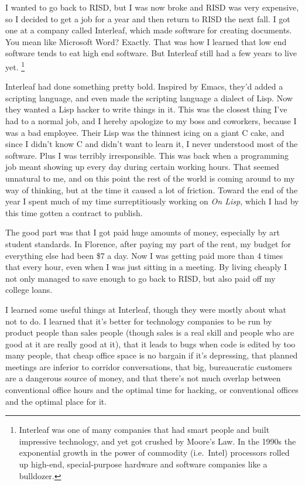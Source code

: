 \documentclass[12pt]{book}
\begin{document}
I wanted to go back to RISD, but I was now broke and RISD was very
expensive, so I decided to get a job for a year and then return to RISD
the next fall. I got one at a company called Interleaf, which made
software for creating documents. You mean like Microsoft Word? Exactly.
That was how I learned that low end software tends to eat high end
software. But Interleaf still had a few years to live yet.
\footnote{Interleaf was one of many companies that had smart people and
built impressive technology, and yet got crushed by Moore's Law. In the
1990s the exponential growth in the power of commodity (i.e.~Intel)
processors rolled up high-end, special-purpose hardware and software
companies like a bulldozer.}

Interleaf had done something pretty bold. Inspired by Emacs, they'd
added a scripting language, and even made the scripting language a
dialect of Lisp. Now they wanted a Lisp hacker to write things in it.
This was the closest thing I've had to a normal job, and I hereby
apologize to my boss and coworkers, because I was a bad employee. Their
Lisp was the thinnest icing on a giant C cake, and since I didn't know C
and didn't want to learn it, I never understood most of the software.
Plus I was terribly irresponsible. This was back when a programming job
meant showing up every day during certain working hours. That seemed
unnatural to me, and on this point the rest of the world is coming
around to my way of thinking, but at the time it caused a lot of
friction. Toward the end of the year I spent much of my time
surreptitiously working on \emph{On Lisp}, which I had by this time
gotten a contract to publish.

The good part was that I got paid huge amounts of money, especially by
art student standards. In Florence, after paying my part of the rent, my
budget for everything else had been \$7 a day. Now I was getting paid
more than 4 times that every hour, even when I was just sitting in a
meeting. By living cheaply I not only managed to save enough to go back
to RISD, but also paid off my college loans.

I learned some useful things at Interleaf, though they were mostly about
what not to do. I learned that it's better for technology companies to
be run by product people than sales people (though sales is a real skill
and people who are good at it are really good at it), that it leads to
bugs when code is edited by too many people, that cheap office space is
no bargain if it's depressing, that planned meetings are inferior to
corridor conversations, that big, bureaucratic customers are a dangerous
source of money, and that there's not much overlap between conventional
office hours and the optimal time for hacking, or conventional offices
and the optimal place for it.
\end{document}
